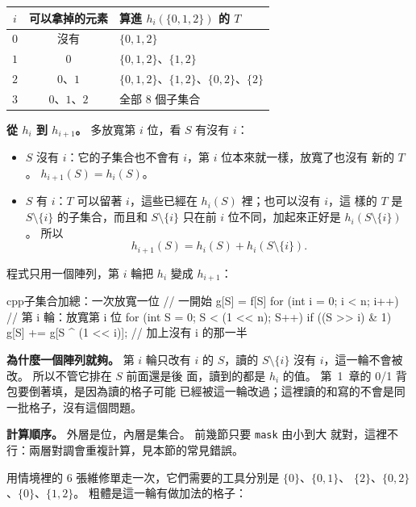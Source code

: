 \begin{center}
\begin{tabular}{ccl}
\toprule
$i$ & 可以拿掉的元素 & 算進 $h_i(\{0, 1, 2\})$ 的 $T$ \\
\midrule
$0$ & 沒有 & $\{0, 1, 2\}$ \\
$1$ & $0$ & $\{0, 1, 2\}$、$\{1, 2\}$ \\
$2$ & $0$、$1$ & $\{0, 1, 2\}$、$\{1, 2\}$、$\{0, 2\}$、$\{2\}$ \\
$3$ & $0$、$1$、$2$ & 全部 $8$ 個子集合 \\
\bottomrule
\end{tabular}
\end{center}

\textbf{從 $h_i$ 到 $h_{i+1}$。} 多放寬第 $i$ 位，看 $S$ 有沒有 $i$：

\begin{itemize}
\item $S$ 沒有 $i$：它的子集合也不會有 $i$，第 $i$ 位本來就一樣，放寬了也沒有
新的 $T$。 $h_{i+1}(S) = h_i(S)$。
\item $S$ 有 $i$：$T$ 可以留著 $i$，這些已經在 $h_i(S)$ 裡；也可以沒有 $i$，這
樣的 $T$ 是 $S \setminus \{i\}$ 的子集合，而且和 $S \setminus \{i\}$ 只在前 $i$
位不同，加起來正好是 $h_i(S \setminus \{i\})$。 所以
\[
h_{i+1}(S) = h_i(S) + h_i(S \setminus \{i\}).
\]
\end{itemize}

程式只用一個陣列，第 $i$ 輪把 $h_i$ 變成 $h_{i+1}$：

\begin{code}{cpp}{子集合加總：一次放寬一位}
// 一開始 g[S] = f[S]
for (int i = 0; i < n; i++) {             // 第 i 輪：放寬第 i 位
    for (int S = 0; S < (1 << n); S++) {
        if ((S >> i) & 1) {
            g[S] += g[S ^ (1 << i)];      // 加上沒有 i 的那一半
        }
    }
}
\end{code}

\textbf{為什麼一個陣列就夠。} 第 $i$ 輪只改有 $i$ 的 $S$，讀的
$S \setminus \{i\}$ 沒有 $i$，這一輪不會被改。 所以不管它排在 $S$ 前面還是後
面，讀到的都是 $h_i$ 的值。 第~1~章的 0/1 背包要倒著填，是因為讀的格子可能
已經被這一輪改過；這裡讀的和寫的不會是同一批格子，沒有這個問題。

\textbf{計算順序。} 外層是位，內層是集合。 前幾節只要 \texttt{mask} 由小到大
就對，這裡不行：兩層對調會重複計算，見本節的常見錯誤。

用情境裡的 $6$ 張維修單走一次，它們需要的工具分別是 $\{0\}$、$\{0, 1\}$、
$\{2\}$、$\{0, 2\}$、$\{0\}$、$\{1, 2\}$。 粗體是這一輪有做加法的格子：

